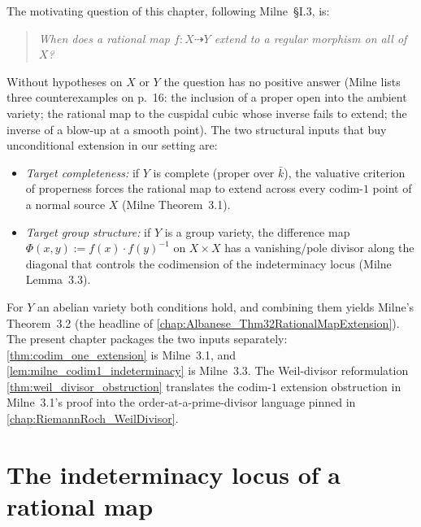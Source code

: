 The motivating question of this chapter, following Milne~\S I.3, is:
\begin{quote}
  \emph{When does a rational map \(f \colon X \dashrightarrow Y\) extend to a regular
  morphism on all of \(X\)?}
\end{quote}
Without hypotheses on \(X\) or \(Y\) the question has no positive answer (Milne lists three
counterexamples on p.~16: the inclusion of a proper open into the ambient variety; the
rational map to the cuspidal cubic whose inverse fails to extend; the inverse of a
blow-up at a smooth point). The two structural inputs that buy unconditional extension
in our setting are:
\begin{itemize}
  \item \emph{Target completeness:} if \(Y\) is complete (proper over \(\bar k\)), the
    valuative criterion of properness forces the rational map to extend across every
    codim-\(1\) point of a normal source \(X\) (Milne Theorem~3.1).
  \item \emph{Target group structure:} if \(Y\) is a group variety, the difference map
    \(\Phi(x, y) := f(x) \cdot f(y)^{-1}\) on \(X \times X\) has a vanishing/pole divisor
    along the diagonal that controls the codimension of the indeterminacy locus
    (Milne Lemma~3.3).
\end{itemize}
For \(Y\) an abelian variety both conditions hold, and combining them yields Milne's
Theorem~3.2 (the headline of \cref{chap:Albanese_Thm32RationalMapExtension}). The
present chapter packages the two inputs separately:
\cref{thm:codim_one_extension} is Milne~3.1, and
\cref{lem:milne_codim1_indeterminacy} is Milne~3.3. The Weil-divisor reformulation
\cref{thm:weil_divisor_obstruction} translates the codim-\(1\) extension obstruction
in Milne~3.1's proof into the order-at-a-prime-divisor language pinned in
\cref{chap:RiemannRoch_WeilDivisor}.

\section{The indeterminacy locus of a rational map}
\label{sec:indeterm_locus}

